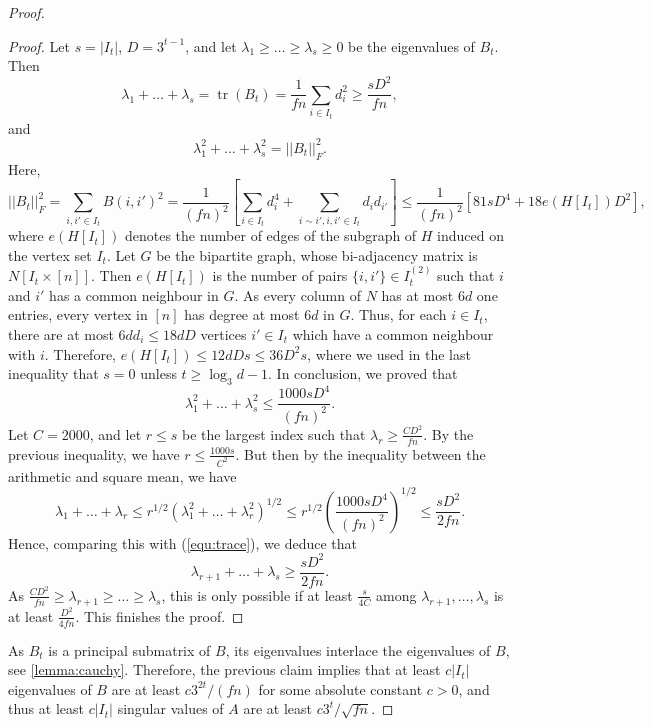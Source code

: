 \documentclass[10pt,a4paper]{amsart}
\DeclareMathOperator{\tr}{tr}
\begin{document}
\begin{proof}
\begin{proof}
Let $s=|I_t|$, $D=3^{t-1}$, and let $\lambda_1\geq \dots\geq \lambda_s\geq 0$ be the eigenvalues of $B_t$. Then 
\begin{equation}\label{equ:trace}
    \lambda_1+\dots+\lambda_s=\tr(B_t)=\frac{1}{fn}\sum_{i\in I_t}d_i^2\geq \frac{sD^2}{fn},
\end{equation}
and
$$\lambda_1^2+\dots+\lambda_s^2=||B_t||_F^2.$$
Here,
$$||B_t||_F^2=\sum_{i,i'\in I_t}B(i,i')^2=\frac{1}{(fn)^2}\left[\sum_{i\in I_t}d_i^4+\sum_{i\sim i',i,i'\in I_t}d_id_{i'} \right]\leq \frac{1}{(fn)^2}\left[81sD^{4}+18e(H[I_t])D^{2}\right],$$
where $e(H[I_t])$ denotes the number of edges of the subgraph of $H$ induced on the vertex set $I_t$. Let $G$ be the bipartite graph, whose bi-adjacency matrix is $N[I_t\times [n]]$. Then $e(H[I_t])$ is the number of pairs $\{i,i'\}\in I_t^{(2)}$ such that $i$ and $i'$ has a common neighbour in $G$. As every column of $N$ has at most $6d$ one entries, every vertex in $[n]$ has degree at most $6d$ in $G$. Thus, for each $i\in I_t$, there are at most $6dd_i\leq 18dD$ vertices $i'\in I_t$ which have a common neighbour with $i$. Therefore, $e(H[I_t])\leq 12dDs\leq 36D^2s$, where we used in the last inequality that $s=0$ unless $t\geq \log_3 d-1$. In conclusion, we proved that 
$$\lambda_1^2+\dots+\lambda_s^2\leq \frac{1000sD^4}{(fn)^2}.$$
Let $C=2000$, and let $r\leq s$ be the largest index such that $\lambda_r\geq \frac{CD^2}{fn}$. By the previous inequality, we have $r\leq \frac{1000s}{C^2}$. But then by the inequality between the arithmetic and square mean, we have $$\lambda_1+\dots+\lambda_r\leq r^{1/2}(\lambda_1^2+\dots+\lambda_r^2)^{1/2}\leq r^{1/2}\left(\frac{1000sD^4}{(fn)^2}\right)^{1/2}\leq \frac{sD^2}{2fn}.$$
Hence, comparing this with (\ref{equ:trace}), we deduce that
$$\lambda_{r+1}+\dots+\lambda_{s}\geq \frac{sD^2}{2fn}.$$
As $\frac{CD^2}{fn}\geq \lambda_{r+1}\geq\dots\geq \lambda_s$, this is only possible if at least $\frac{s}{4C}$ among $\lambda_{r+1},\dots,\lambda_s$ is at least $\frac{D^2}{4fn}$. This finishes the proof.
\end{proof}
As $B_t$ is a principal submatrix of $B$, its eigenvalues interlace the eigenvalues of $B$, see \cref{lemma:cauchy}. Therefore, the previous claim implies that at least $c|I_t|$ eigenvalues of $B$ are at least $c3^{2t}/(fn)$ for some absolute constant $c>0$, and thus at least $c|I_t|$ singular values of $A$ are at least $c3^t/\sqrt{fn}$. 


\end{proof}
\end{document}
